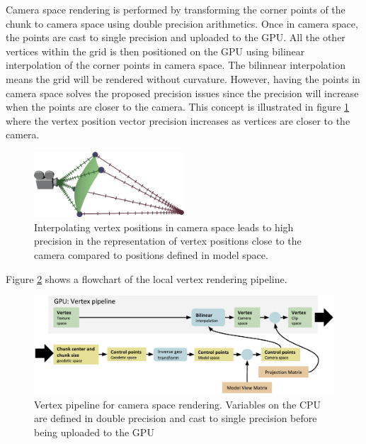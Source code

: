 Camera space rendering is performed by transforming the corner points of the chunk to camera space using double precision arithmetics. Once in camera space, the points are cast to single precision and uploaded to the GPU. All the other vertices within the grid is then positioned on the GPU using bilinear interpolation of the corner points in camera space. The bilinnear interpolation means the grid will be rendered without curvature. However, having the points in camera space solves the proposed precision issues since the precision will increase when the points are closer to the camera. This concept is illustrated in figure \ref{fig:local} where the vertex position vector precision increases as vertices are closer to the camera.

\begin{figure}[htbp]
    \centering
    \includegraphics[width=0.5\textwidth]{figures/implementation/rendering/local.pdf}
    \caption{Interpolating vertex positions in camera space leads to high precision in the representation of vertex positions close to the camera compared to positions defined in model space.}
    \label{fig:local}
\end{figure}

Figure \ref{fig:pipelinelocal} shows a flowchart of the local vertex rendering pipeline.

\begin{figure}[htbp]
    \centering
    \includegraphics[width=\textwidth]{figures/implementation/rendering/pipeline_local.pdf}
    \caption{Vertex pipeline for camera space rendering. Variables on the CPU are defined in double precision and cast to single precision before being uploaded to the GPU}
    \label{fig:pipelinelocal}
\end{figure}


